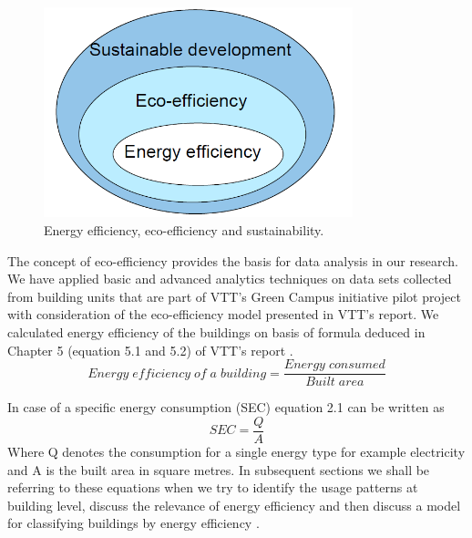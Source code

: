 \begin{figure}[ht]
  \begin{center}
    \includegraphics[width=0.8\textwidth]{images/eco-effeciency.png}
    \caption{ Energy efficiency, eco-efficiency and sustainability\cite{forsstrommeasuring}.}
    \label{fig:eco-effeciency}
  \end{center}
\end{figure}

The concept of eco-efficiency provides the basis for data analysis in our research. We have applied basic and advanced analytics techniques on data sets collected from building units that are part of VTT's Green Campus initiative pilot project with consideration of the eco-efficiency model presented in VTT's report. We calculated energy efficiency of  the buildings on basis of formula deduced in Chapter 5 (equation 5.1 and 5.2) of VTT's  report \cite{forsstrommeasuring}.
\begin{equation}
Energy\;efficiency\;of\;a\;building  =  \frac{Energy\;consumed}{Built\;area}
\end{equation}  

In case of a specific energy consumption (SEC) \cite{forsstrommeasuring} equation 2.1 can be written as 
\begin{equation} \label{spec_energy}
SEC  = \frac{Q}{A}
\end{equation} 
Where Q denotes the consumption for a single energy type for example electricity and A is the built area in square metres. In subsequent sections we shall be  referring to these equations when we try to identify the usage patterns at building level, discuss the relevance of  energy efficiency and then discuss a model for classifying buildings by energy efficiency .


